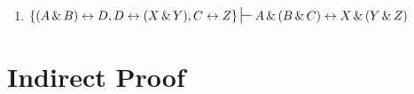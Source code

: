 \begin{enumerate}[label=(\arabic*)]

%


\item $\{(A \eand B) \eiff D, D \eiff (X \eand Y), C \eiff Z\} \sststile{}{} A \eand (B \eand C) \eiff X \eand (Y \eand Z)$
%
%
%	



\end{enumerate}	




\section{Indirect Proof}
\label{sec:indirect_proof}

